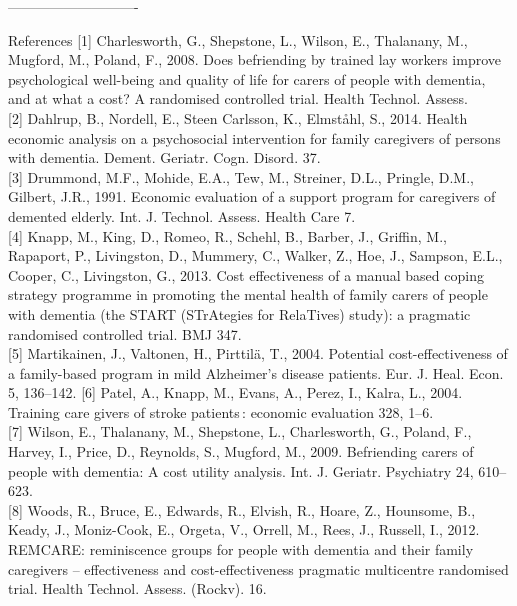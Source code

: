 \documentclass[final]{beamer}
\newlength{\onecolwid}
\begin{document}
\begin{frame}[t]
\begin{columns}[t]
\begin{column}{\onecolwid}
----------------------------
\vspace{-1.0cm}
\begin{block}{References}
\vspace{-0.2cm}
\nocite{}{\scriptsize [1] Charlesworth, G., Shepstone, L., Wilson, E., Thalanany, M., Mugford, M., Poland, F., 2008. Does befriending by trained lay workers improve psychological well-being and quality of life for carers of people with dementia, and at what a cost? A randomised controlled trial. Health Technol. Assess.} \\
\nocite{}{\scriptsize [2] Dahlrup, B., Nordell, E., Steen Carlsson, K., Elmståhl, S., 2014. Health economic analysis on a psychosocial intervention for family caregivers of persons with dementia. Dement. Geriatr. Cogn. Disord. 37.}\\
\nocite{}{\scriptsize [3] Drummond, M.F., Mohide, E.A., Tew, M., Streiner, D.L., Pringle, D.M., Gilbert, J.R., 1991. Economic evaluation of a support program for caregivers of demented elderly. Int. J. Technol. Assess. Health Care 7.}\\
\nocite{}{\scriptsize [4] Knapp, M., King, D., Romeo, R., Schehl, B., Barber, J., Griffin, M., Rapaport, P., Livingston, D., Mummery, C., Walker, Z., Hoe, J., Sampson, E.L., Cooper, C., Livingston, G., 2013. Cost effectiveness of a manual based coping strategy programme in promoting the mental health of family carers of people with dementia (the START (STrAtegies for RelaTives) study): a pragmatic randomised controlled trial. BMJ 347. }\\
\nocite{}{\scriptsize [5] Martikainen, J., Valtonen, H., Pirttilä, T., 2004. Potential cost-effectiveness of a family-based program in mild Alzheimer’s disease patients. Eur. J. Heal. Econ. 5, 136–142.}
\nocite{}{\scriptsize [6] Patel, A., Knapp, M., Evans, A., Perez, I., Kalra, L., 2004. Training care givers of stroke patients : economic evaluation 328, 1–6}.\\
\nocite{}{\scriptsize [7] Wilson, E., Thalanany, M., Shepstone, L., Charlesworth, G., Poland, F., Harvey, I., Price, D., Reynolds, S., Mugford, M., 2009. Befriending carers of people with dementia: A cost utility analysis. Int. J. Geriatr. Psychiatry 24, 610–623.}\\
\nocite{}{\scriptsize [8] Woods, R., Bruce, E., Edwards, R., Elvish, R., Hoare, Z., Hounsome, B., Keady, J., Moniz-Cook, E., Orgeta, V., Orrell, M., Rees, J., Russell, I., 2012. REMCARE: reminiscence groups for people with dementia and their family caregivers – effectiveness and cost-effectiveness pragmatic multicentre randomised trial. Health Technol. Assess. (Rockv). 16.}\\
\end{block}


\end{column}
\end{columns}
\end{frame}
\end{document}

